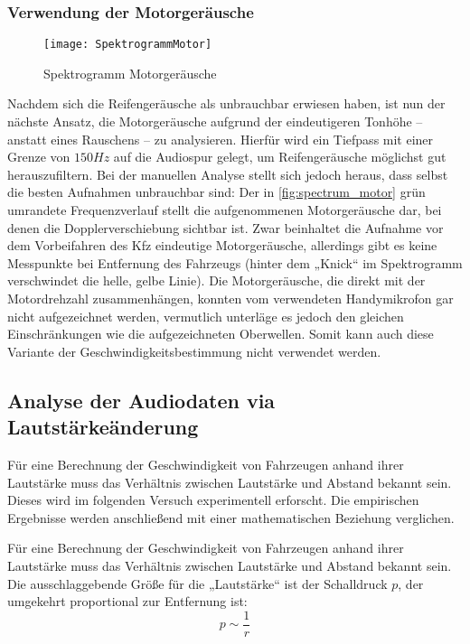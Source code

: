\subsubsection{Verwendung der Motorgeräusche}

\begin{figure}[h]
    \centering
    \texttt{[image: SpektrogrammMotor]}
    \caption{Spektrogramm Motorgeräusche}
    \label{fig:spectrum_motor}
\end{figure}

Nachdem sich die Reifengeräusche als unbrauchbar erwiesen haben, ist nun der nächste Ansatz, die Motorgeräusche aufgrund der eindeutigeren Tonhöhe -- anstatt eines Rauschens -- zu analysieren. Hierfür wird ein Tiefpass mit einer Grenze von \(150 Hz\) auf die Audiospur gelegt, um Reifengeräusche möglichst gut herauszufiltern. Bei der manuellen Analyse stellt sich jedoch heraus, dass selbst die besten Aufnahmen unbrauchbar sind: Der in \autoref{fig:spectrum_motor} grün umrandete Frequenzverlauf stellt die aufgenommenen Motorgeräusche dar, bei denen die Dopplerverschiebung sichtbar ist. Zwar beinhaltet die Aufnahme vor dem Vorbeifahren des Kfz eindeutige Motorgeräusche, allerdings gibt es keine Messpunkte bei Entfernung des Fahrzeugs (hinter dem „Knick“ im Spektrogramm verschwindet die helle, gelbe Linie). Die Motorgeräusche, die direkt mit der Motordrehzahl zusammenhängen, konnten vom verwendeten Handymikrofon gar nicht aufgezeichnet werden, vermutlich unterläge es jedoch den gleichen Einschränkungen wie die aufgezeichneten Oberwellen. Somit kann auch diese Variante der Geschwindigkeitsbestimmung nicht verwendet werden.

\subsection{Analyse der Audiodaten via Lautstärkeänderung}
Für eine Berechnung der Geschwindigkeit von Fahrzeugen anhand ihrer Lautstärke muss das Verhältnis zwischen Lautstärke und Abstand bekannt sein. Dieses wird im folgenden Versuch experimentell erforscht. Die empirischen Ergebnisse werden anschließend mit einer mathematischen Beziehung verglichen.

Für eine Berechnung der Geschwindigkeit von Fahrzeugen anhand ihrer Lautstärke muss das Verhältnis zwischen Lautstärke und Abstand bekannt sein. Die ausschlaggebende Größe für die „Lautstärke“ ist der Schalldruck \(p\), der umgekehrt proportional zur Entfernung ist:
\[
    p \sim \frac{1}{r}
\]

